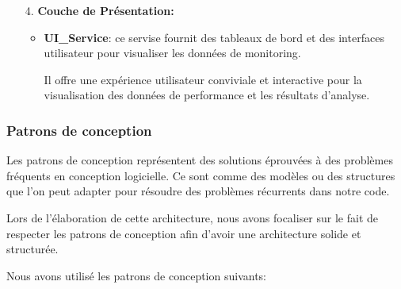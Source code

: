 \begin{enumerate}
        \item[4.] \textbf{Couche de Présentation:}
            \begin{itemize}
                \item \textbf{UI\_Service}: ce servise fournit des tableaux de bord et des interfaces utilisateur pour visualiser les données de monitoring.
                \par Il offre une expérience utilisateur conviviale et interactive pour la visualisation des données de performance et les résultats d'analyse.
            \end{itemize}
    \end{enumerate}
\subsubsection{Patrons de conception}
\par Les patrons de conception représentent des solutions éprouvées à des problèmes fréquents en conception logicielle. Ce sont comme des modèles ou des structures que l'on peut adapter pour résoudre des problèmes récurrents dans notre code\cite{design_pattern}.
\par Lors de l'élaboration de cette architecture, nous avons focaliser sur le fait de respecter les patrons de conception afin d'avoir une architecture solide et structurée.
\par Nous avons utilisé les patrons de conception suivants:
